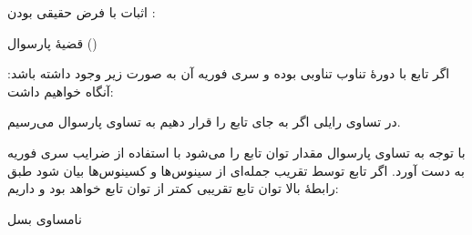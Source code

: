 \begin{EMproof}

اثبات با فرض حقیقی بودن :

\end{EMproof}

\EMhold


\begin{EMtheorem}{قضیهٔ پارسوال ()}

اگر تابع  با دورهٔ تناوب  تناوبی بوده و سری فوریه آن به صورت زیر وجود داشته باشد:
آنگاه خواهیم داشت:

\end{EMtheorem}

\begin{EMproof}

در تساوی رایلی اگر به جای  تابع  را قرار دهیم به تساوی پارسوال می‌رسیم.

\end{EMproof}

با توجه به تساوی پارسوال مقدار توان تابع  را می‌شود با استفاده از ضرایب سری فوریه به دست آورد. اگر تابع توسط تقریب  جمله‌ای از سینوس‌ها و کسینوس‌ها بیان شود طبق رابطهٔ بالا توان تابع تقریبی کمتر از توان تابع  خواهد بود و داریم:

\begin{EMimportant}{نامساوی بسل}


\end{EMimportant}


